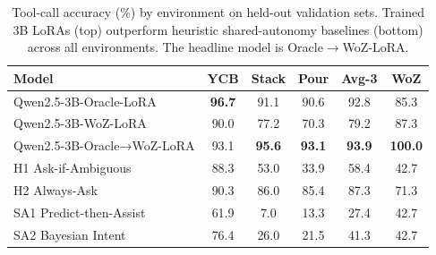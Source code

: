 \begin{table}[t]
\centering
\small
\setlength{\tabcolsep}{4pt}
\caption{Tool-call accuracy (\%) by environment on held-out validation sets. Trained 3B LoRAs (top) outperform heuristic shared-autonomy baselines (bottom) across all environments. The headline model is Oracle$\rightarrow$WoZ-LoRA.}
\label{tab:per_env}
\begin{tabular}{lccccc}
\toprule
Model & YCB & Stack & Pour & Avg-3 & WoZ \\
\midrule
Qwen2.5-3B-Oracle-LoRA & \textbf{96.7} & 91.1 & 90.6 & 92.8 & 85.3 \\
Qwen2.5-3B-WoZ-LoRA & 90.0 & 77.2 & 70.3 & 79.2 & 87.3 \\
Qwen2.5-3B-Oracle→WoZ-LoRA & 93.1 & \textbf{95.6} & \textbf{93.1} & \textbf{93.9} & \textbf{100.0} \\
\midrule
H1 Ask-if-Ambiguous & 88.3 & 53.0 & 33.9 & 58.4 & 42.7 \\
H2 Always-Ask & 90.3 & 86.0 & 85.4 & 87.3 & 71.3 \\
SA1 Predict-then-Assist & 61.9 & 7.0 & 13.3 & 27.4 & 42.7 \\
SA2 Bayesian Intent & 76.4 & 26.0 & 21.5 & 41.3 & 42.7 \\
\bottomrule
\end{tabular}
\end{table}
